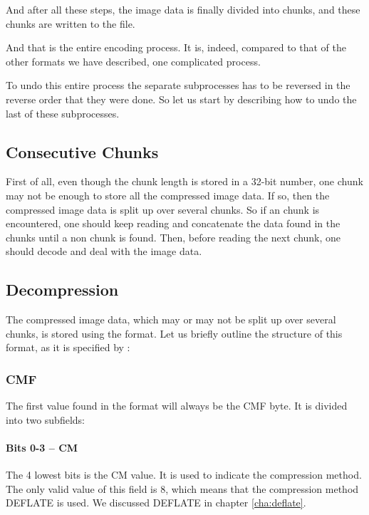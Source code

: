 And after all these steps, the image data is finally divided into
\IDAT chunks, and these chunks are written to the file.

And that is the entire encoding process. It is, indeed, compared to
that of the other formats we have described, one complicated process.

To undo this entire process the separate subprocesses has to be
reversed in the reverse order that they were done. So let us start by
describing how to undo the last of these subprocesses.

\subsection{Consecutive Chunks}

First of all, even though the chunk length is stored in a 32-bit
number, one chunk may not be enough to store all the compressed image
data. If so, then the compressed image data is split up over several
\IDAT chunks. So if an \IDAT chunk is encountered, one should keep
reading and concatenate the data found in the \IDAT chunks until a non
\IDAT chunk is found. Then, before reading the next chunk, one should
decode and deal with the image data.

\subsection{Decompression}
\label{sec:png-dec}

The compressed image data, which may or may not be split up over
several \IDAT chunks, is stored using the \zlib format. Let us briefly
outline the structure of this format, as it is specified by
\cite{gailly96:_zlib_compr_data_format_specif}:

\subsubsection{CMF}

The first value found in the \zlib format will always be the CMF
byte. It is divided into two subfields:

\paragraph{Bits 0-3 -- CM}

The 4 lowest bits is the CM value. It is used to indicate the
compression method. The only valid value of this field is $8$, which
means that the compression method DEFLATE is used. We discussed
DEFLATE in chapter \ref{cha:deflate}.

